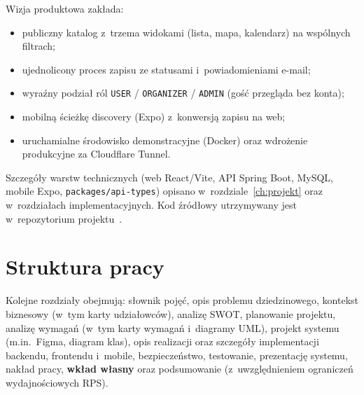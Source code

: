 \documentclass{sprz}
\begin{document}
Wizja produktowa zakłada:  
\begin{itemize}  
 \item publiczny katalog z~trzema widokami (lista, mapa, kalendarz) na wspólnych filtrach;  
 \item ujednolicony proces zapisu ze statusami i~powiadomieniami e-mail;  
 \item wyraźny podział ról \texttt{USER} / \texttt{ORGANIZER} / \texttt{ADMIN} (gość przegląda bez konta);  
 \item mobilną ścieżkę discovery (Expo) z~konwersją zapisu na web;  
 \item uruchamialne środowisko demonstracyjne (Docker) oraz wdrożenie produkcyjne za Cloudflare Tunnel.  
\end{itemize}  
  
Szczegóły warstw technicznych (web React/Vite, API Spring Boot, MySQL, mobile Expo, \texttt{packages/api-types}) opisano w~rozdziale~\ref{ch:projekt} oraz w~rozdziałach implementacyjnych. Kod źródłowy utrzymywany jest w~repozytorium projektu~\cite{raceportal:repo}.  
  
\section{Struktura pracy}  
Kolejne rozdziały obejmują: słownik pojęć, opis problemu dziedzinowego, kontekst biznesowy (w~tym karty udziałowców), analizę SWOT, planowanie projektu, analizę wymagań (w~tym karty wymagań i~diagramy UML), projekt systemu (m.in.\ Figma, diagram klas), opis realizacji oraz szczegóły implementacji backendu, frontendu i~mobile, bezpieczeństwo, testowanie, prezentację systemu, nakład pracy, \textbf{wkład własny} oraz podsumowanie (z~uwzględnieniem ograniczeń wydajnościowych RPS).  
  
\end{document}
